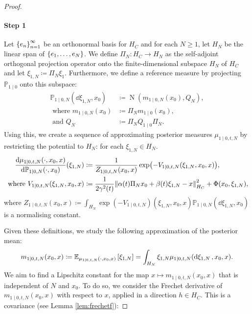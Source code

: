 \begin{proof}
  \paragraph{Step 1} Let \(\qty{e_{n}}_{n=1}^{\infty}\) be an orthonormal basis for \(H_{C}\) and for each \(N \geq 1\), let \(H_{N}\) be the linear span of \(\qty{e_{1}, \ldots, e_{N}}\). We define \(\Pi_{N} : H_{C} \to H_{N}\) as the self-adjoint orthogonal projection operator onto the finite-dimensional subspace \(H_{N}\) of \(H_{C}\) and let \(\xi_{1,N} \coloneqq \Pi_{N} \xi_{1}\). Furthermore, we define a reference measure by projecting \(\mathbb{P}_{1 \mid 0}\) onto this subspace:
  \begin{align*}
    \mathbb{P}_{1 \mid 0, N}(\dd{\xi_{1, N}}, x_{0}) &\coloneqq \operatorname{N}(m_{1 \mid 0, N}(x_{0}),  Q_{N}), \\
    \text{ where } m_{1 \mid 0, N}(x_{0}) &\coloneqq \Pi_{N} m_{1 \mid 0}(x_{0}), \\
    \text{ and } Q_{N} &\coloneqq \Pi_{N} Q_{1 \mid 0} \Pi _{N}.
  \end{align*}
  Using this, we create a sequence of approximating posterior measures \(\mu_{1 \mid 0, t, N}\) by restricting the potential to \(H_{N}\): for each \(\xi_{1,N} \in H_{N}\).
  \begin{align*}
    \dv{\mu_{1 \mid 0, t, N}(\cdot, x_{0}, x)}{\mathbb{P}_{1 \mid 0, N}(\cdot, x_{0})}{}(\xi_{1,N}) &\coloneqq \frac{1}{Z_{1 \mid 0, t, N}(x_{0}, x)} \exp(-V_{1 \mid 0, t, N}(\xi_{1,N}, x_{0}, x)), \\
    \text{ where } V_{1 \mid 0, t, N}(\xi_{1, N}, x_{0}, x) &\coloneqq  \frac{1}{2\gamma^{2}(t)} \norm{\alpha(t) \Pi_{N} x_{0} + \beta(t) \xi_{1, N} - x}^{2}_{H_{C}} + \Phi(x_{0}, \xi_{1, N}),
  \end{align*}
  where \(Z_{1 \mid 0, t, N}(x_{0}, x) \coloneqq \int_{H_{N}} \exp(-V_{1 \mid 0, t, N})(\xi_{1, N}, x_{0}, x) \mathbb{P}_{1 \mid 0, N}(\dd{\xi_{1, N}, x_{0}})\) is a normalising constant.

  Given these definitions, we study the following approximation of the posterior mean:
  \begin{equation}
    m_{1 \mid 0, t, N}(x_{0}, x) \coloneqq \mathop{\mathbb{E}_{\mu_{1 \mid 0, t, N}(\cdot, x_{0}, x)}}\qty[\xi_{1, N}] = \int_{H_{N}} \xi_{1, N}\mu_{1 \mid 0, t, N}(\dd{\xi_{1, N}}, x_{0}, x).\label{eqn:apm}
  \end{equation}
  We aim to find a Lipschitz constant for the map \(x \mapsto m_{1 \mid 0, t, N}(x_{0}, x)\) that is independent of \(N\) and \(x_{0}\). To do so, we consider the Frechet derivative of \(m_{1 \mid 0, t, N}(x_{0}, x)\) with respect to \(x\), applied in a direction \(h \in H_{C}\). This is a covariance (see Lemma \ref{lem:frechetf}):


\end{proof}
